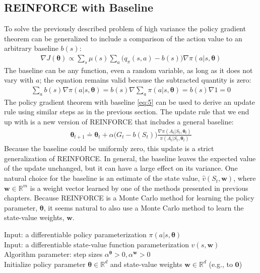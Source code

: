 {\subsection{REINFORCE with Baseline}
To solve the previously described problem of high variance the policy gradient theorem can be generalized to include a comparison of the
action value to an arbitrary baseline $b(s)$:
\begin{align}\label{eq:5}
    \nabla J(\bm{\theta})\propto\sum_{s}\mu(s)\sum_a \Big(q_\pi(s,a)-b(s)\Big)\nabla\pi(a|s, \bm{\theta})
\end{align}
The baseline can be any function, even a random variable, as long as it does not vary with $a$; the equation remains valid because the subtracted quantity is zero:
\begin{align*}
    \sum_a b(s)\nabla\pi(a|s, \bm{\theta})=b(s)\nabla\sum_a\pi(a|s, \bm{\theta})=b(s)\nabla 1=0
\end{align*}
The policy gradient theorem with baseline \ref{eq:5} can be used to derive an update
rule using similar steps as in the previous section. The update rule that we end up with
is a new version of REINFORCE that includes a general baseline:
\begin{align}
    \bm{\theta}_{t+1}\doteq\bm{\theta}_t+\alpha\Big(G_t-b(S_t)\Big)\frac{\nabla\pi(A_t|S_t, \bm{\theta}_t)}{\pi(A_t|S_t, \bm{\theta}_t)}
\end{align}
Because the baseline could be uniformly zero, this update is a strict generalization of REINFORCE. In general, the baseline leaves the expected value of the update unchanged, but it can have a large effect on its variance.
One natural choice for the baseline is an estimate of the state value, $\hat{v}(S_t,\bm{w})$, where $\bm{w}\in \mathbb{R}^m$ is a weight vector learned by one of the methods presented in previous chapters.
Because REINFORCE is a Monte Carlo method for learning the policy parameter, $\bm{\theta}$,
it seems natural to also use a Monte Carlo method to learn the state-value weights, $\bm{w}$.

\begin{tcolorbox}[colback=black!7!white,colframe=black!75!white,title=\textbf{REINFORCE with Baseline (episodic), for $\pi_\theta\approx\pi_* $}]
    Input: a differentiable policy parameterization $\pi(a|s,\bm{\theta})$\\
    Input: a differentiable state-value function parameterization $\hat{v}(s,\bm{w})$\\
    Algorithm parameter: step sizes $\alpha^{\bm{\theta}} > 0, \alpha^{\bm{w}} > 0$\\
    Initialize policy parameter $\bm{\theta}\in\mathbb{R}^d$ and state-value weights $\bm{w}\in\mathbb{R}^d$  (e.g., to $\bm{0}$)\\
    

\end{tcolorbox}}
